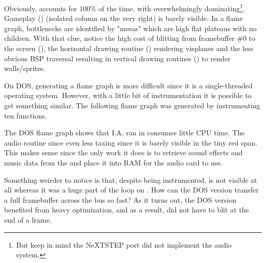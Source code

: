 \par
Obviously,  accounts for 100\% of the time, with  overwhelmingly dominating\footnote{But keep in mind the NeXTSTEP port did not implement the audio system.}. Gameplay () (isolated column on the very right) is barely visible. In a flame graph, bottlenecks are identified by "mesas" which are high flat plateaus with no children. With that clue, notice the high cost of blitting from framebuffer \#0 to the screen (), the horizontal drawing routine () rendering visplanes and the less obvious BSP traversal resulting in vertical drawing routines () to render walls/sprites.




On DOS, generating a flame graph is more difficult since it is a single-threaded operating system. However, with a little bit of instrumentation it is possible to get something similar. The following flame graph was generated by instrumenting ten functions.\\
\par
\vspace{4mm}
\par
The DOS flame graph shows that I.A. ran in  consumes little CPU time. The audio routine  since even less taxing since it is barely visible in the tiny red span. This makes sense since the only work it does is to retrieve sound effects and music data from the  and place it into RAM for the audio card to use.\\
\par
 Something weirder to notice is that, despite being instrumented,  is not visible at all whereas it was a huge part of the loop on \NeXTns{}. How can the DOS version transfer a full framebuffer across the bus so fast? As it turns out, the DOS version benefited from heavy optimization, and as a result, did not have to blit at the end of a frame.\\
\par

